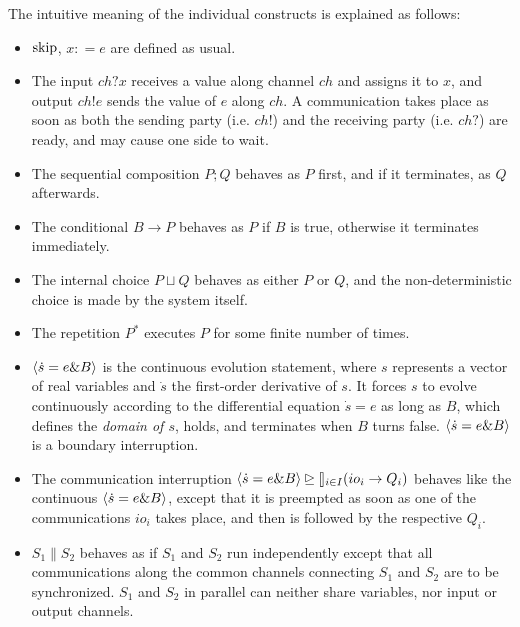 \documentclass{llncs}
\begin{document}
The intuitive meaning of the individual constructs is explained as follows:
\begin{itemize}
\item  $\textmd{skip}$, $x: = e$ are defined as usual.
\item The input $ch?x$ receives a value along channel $ch$ and assigns it to $x$, and output
 $ch!e$ sends the value of $e$ along  $ch$.
A communication takes place as soon as both the sending party (i.e. $ch!$) and the receiving party (i.e. $ch?$) are ready, and may cause one side to wait.
\item The sequential composition $P; Q$ behaves as $P$ first, and if it terminates, as $Q$ afterwards.
\item The conditional $B \rightarrow P$ behaves as $P$ if $B$ is true, otherwise it terminates immediately.
\item The internal choice $P \sqcup Q$ behaves as either $P$ or $Q$, and the non-deterministic choice is made by the system itself.
\item The repetition $P^*$ executes $P$ for some finite number of times.
\item $\langle \dot{s}=e\& B\rangle$ is the continuous
 evolution statement, where $s$ represents a vector of real variables and $\dot{s}$ the first-order derivative of $s$.
 It forces  $s$  to evolve continuously according to  the differential equation  $\dot{s}=e$ as long
 as $B$, which defines the
{\em domain of $s$}, holds, and terminates when $B$ turns false. $\langle \dot{s}=e\& B\rangle$ is a boundary interruption.
\item The communication interruption $\langle \dot{s}=e\& B\rangle \unrhd \talloblong_{i\in I} (io_i \rightarrow Q_i)$ behaves like the continuous $\langle \dot{s}=e\& B\rangle$, except that it is preempted as soon as one of the communications $io_i$ takes place,
and then is followed by the respective $Q_i$.
\item $S_1\|S_2$ behaves as if $S_1$ and $S_2$ run independently except that all communications along the common channels connecting $S_1$ and $S_2$ are to be synchronized. $S_1$ and $S_2$ in parallel can neither share variables, nor input or output channels.
\end{itemize}
 
\end{document}
